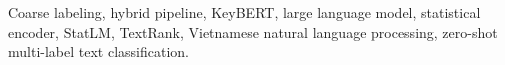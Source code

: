 \documentclass[conference]{IEEEtran}
\begin{document}
\begin{IEEEkeywords}
Coarse labeling, hybrid pipeline, KeyBERT, large language model, statistical
encoder, StatLM, TextRank, Vietnamese natural language processing, zero-shot
multi-label text classification.
\end{IEEEkeywords}

















\end{document}
